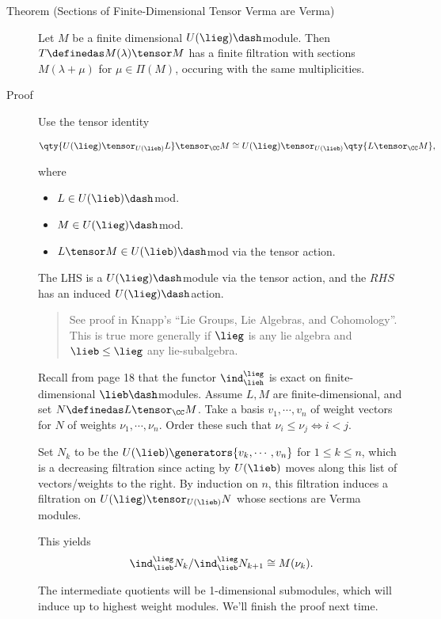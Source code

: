 \begin{description}
\item[Theorem (Sections of Finite-Dimensional Tensor Verma are Verma)]
Let \(M\) be a finite dimensional \(U(\lieg)\dash\)module. Then
\(T \definedas M(\lambda) \tensor M\) has a finite filtration with
sections \(M(\lambda + \mu)\) for \(\mu \in \Pi(M)\), occuring with the
same multiplicities.
\item[Proof]
Use the tensor identity

\begin{align*}
\qty{ U(\lieg) \tensor_{U(\lieb)} L} \tensor_\CC M 
\cong U(\lieg)\tensor_{U(\lieb)} \qty{ L \tensor_\CC M  }
,\end{align*}

where

\begin{itemize}
\tightlist
\item
  \(L \in U(\lieb)\dash\)mod.
\item
  \(M \in U(\lieg)\dash\)mod.
\item
  \(L\tensor M \in U(\lieb)\dash\)mod via the tensor action.
\end{itemize}

The LHS is a \(U(\lieg)\dash\)module via the tensor action, and the
\(RHS\) has an induced \(U(\lieg)\dash\)action.

\begin{quote}
See proof in Knapp's ``Lie Groups, Lie Algebras, and Cohomology''. This
is true more generally if \(\lieg\) is any lie algebra and
\(\lieb\leq \lieg\) any lie-subalgebra.
\end{quote}

Recall from page 18 that the functor \(\ind_\lieh^\lieg\) is exact on
finite-dimensional \(\lieb\dash\)modules. Assume \(L, M\) are
finite-dimensional, and set \(N \definedas L \tensor_\CC M\). Take a
basis \(v_1, \cdots, v_n\) of weight vectors for \(N\) of weights
\(\nu_1, \cdots, \nu_n\). Order these such that
\(\nu_i \leq \nu_j \iff i<j\). \newline

Set \(N_k\) to be the \(U(\lieb)\generators{v_k, \cdots, v_n}\) for
\(1\leq k \leq n\), which is a decreasing filtration since acting by
\(U(\lieb)\) moves along this list of vectors/weights to the right. By
induction on \(n\), this filtration induces a filtration on
\(U(\lieg)\tensor_{U(\lieb)} N\) whose sections are Verma modules.

This yields
\begin{align*}
\ind_\lieb^\lieg N_k / \ind_\lieb^\lieg N_{k+1} \cong M(\nu_k)
.\end{align*}

The intermediate quotients will be 1-dimensional submodules, which will
induce up to highest weight modules. We'll finish the proof next time.
\end{description}

